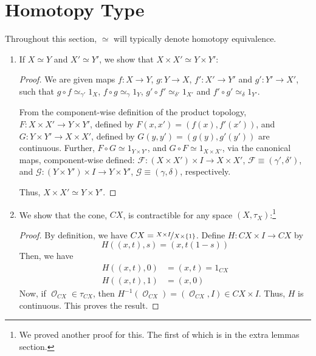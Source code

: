 \documentclass{book}
\DeclareMathOperator*{\Ocal}{\mathcal{O}}
\begin{document}
\section{Homotopy Type}
\par Throughout this section, $\simeq$ will typically denote homotopy equivalence.
\begin{enumerate}[(1)]
    \item If $X \simeq Y$ and $X' \simeq Y'$, we show that $X \times X' \simeq Y \times Y'$: 
        \begin{proof} We are given maps $f: X \rightarrow Y$, $g: Y \rightarrow X$, $f':X' \rightarrow Y'$ and $g': Y' \rightarrow X'$, such that $g \circ f \simeq_{\gamma'} 1_X$, $f \circ g \simeq_{\gamma} 1_Y$, $g' \circ f' \simeq_{\delta '} 1_{X'}$ and $f' \circ g' \simeq_{\delta} 1_{Y'}$. 
            \par From the component-wise definition of the product topology, $F: X \times X' \rightarrow Y \times Y'$, defined by $F(x,x') = (f(x), f'(x'))$, and $G: Y \times Y' \rightarrow X \times X'$, defined by $G(y,y') = (g(y), g'(y'))$ are continuous. Further, $F \circ G \simeq 1_{Y \times Y'}$, and $G \circ F \simeq 1_{X \times X'}$, via the canonical maps, component-wise defined: $\mathcal{F}:(X \times X') \times I \rightarrow X \times X'$, $\mathcal{F} \equiv (\gamma', \delta')$, and $\mathcal{G}:(Y \times Y') \times I \rightarrow Y \times Y'$, $\mathcal{G} \equiv (\gamma, \delta)$, respectively. 
            \par Thus, $X \times X' \simeq Y \times Y'$.
        \end{proof}

    \item We show that the cone, $CX$, is contractible for any space $(X, \tau_X)$:\footnote{We proved another proof for this. The first of which is in the extra lemmas section.}
        \begin{proof} By definition, we have $CX = \nicefrac{X \times I}{X\times \{1\}}$. Define ${H}: CX \times I \rightarrow CX$ by $${H}((x,t),s) = (x, t(1-s))$$ Then, we have 
            \begin{align*}
                {H}((x,t), 0) & = (x,t) = 1_{CX} \\
                {H}((x,t),1) & = (x,0) 
            \end{align*}
            Now, if ${\Ocal}_{CX} \in \tau_{CX}$, then $H^{-1}({\Ocal}_{CX}) = ({\Ocal}_{CX}, I) \in  CX \times I$. Thus, $H$ is continuous. This proves the result. 
        \end{proof}


\end{enumerate}
\end{document}
